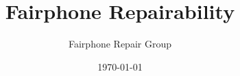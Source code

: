 \documentclass[final,a4paper]{report} %
\author{Fairphone Repair Group}
\title{Fairphone Repairability}
\date{\today}
\begin{document}
	\begin{appendices}
		\renewcommand{\chapternumber}{\appendixname\space\thechapter} 
	
	\end{appendices}
\end{document}
